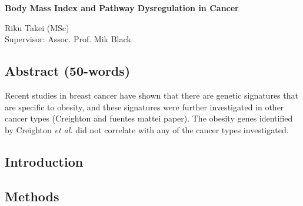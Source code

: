 \documentclass[12pt, a4paper]{article}
\begin{document}
\begin{center}
\Large{\textbf{Body Mass Index and Pathway Dysregulation in Cancer}}\\
\end{center}

\begin{center}
Riku Takei (MSc)\\
Supervisor: Assoc. Prof. Mik Black
\end{center}

\subsection*{Abstract (50-words)}

Recent studies in breast cancer have shown that there are genetic signatures that are specific to obesity, and these signatures were further investigated in other cancer types (Creighton and fuentes mattei paper).
The obesity genes identified by Creighton \textit{et al.} did not correlate with any of the cancer types investigated.

\subsection*{Introduction}



\newpage

\subsection*{Methods}
\end{document}
